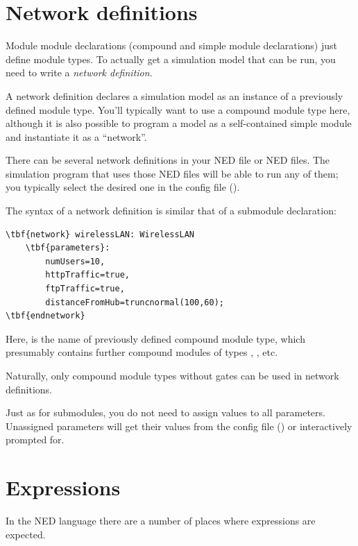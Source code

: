 \section{Network definitions}

Module module declarations (compound and simple module declarations)
just define module types. To actually get a simulation model that
can be run, you need to write a \textit{network definition}.

A network definition declares a simulation model as an instance
of a previously defined module type. You'll typically want to use
a compound module type here, although it is also possible to
program a model as a self-contained simple module and instantiate it
as a ``network''.

There can be several network definitions in your NED file or NED files.
The simulation program that uses those NED files will be
able to run any of them; you typically select the desired one
in the config file ().

The syntax of a network definition is similar that of a submodule
declaration:

\begin{Verbatim}[commandchars=\\\{\}]
\tbf{network} wirelessLAN: WirelessLAN
    \tbf{parameters}:
        numUsers=10,
        httpTraffic=true,
        ftpTraffic=true,
        distanceFromHub=truncnormal(100,60);
\tbf{endnetwork}
\end{Verbatim}

Here,  is the name of previously defined
compound module type, which presumably contains further
compound modules of types , , etc.

Naturally, only compound module types without gates can
be used in network definitions.

Just as for submodules, you do not need to assign values to all
parameters. Unassigned parameters will get their values from the
config file () or interactively prompted for.



\section{Expressions}
\label{ch-ned-lang:sec:expressions}

In the NED language there are a number of places where
expressions are expected.


